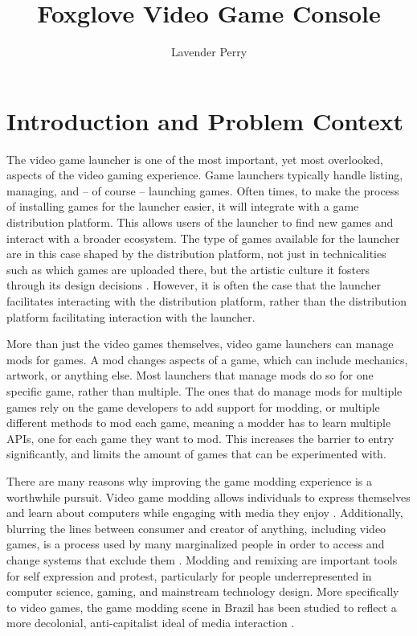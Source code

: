 \documentclass[10pt,twocolumn]{article}
\title{Foxglove Video Game Console}
\author{Lavender Perry}
\affiliation{Occidental College}
\begin{document}
\maketitle

\section{Introduction and Problem Context}

The video game launcher is one of the most important, yet most overlooked,
aspects of the video gaming experience. Game launchers typically handle
listing, managing, and -- of course -- launching games.
Often times, to make the process of installing games for the launcher easier,
it will integrate with a game distribution platform. This allows users of the
launcher to find new games and interact with a broader ecosystem. The type of
games available for the launcher are in this case shaped by the distribution
platform, not just in technicalities such as which games are uploaded there,
but the artistic culture it fosters through its design decisions
\cite{werning_itchio_2019}.
However, it is often the case that the launcher facilitates interacting with the
distribution platform, rather than the distribution platform facilitating
interaction with the launcher.

More than just the video games themselves, video game launchers can manage mods
for games. A mod changes aspects of a game, which can include mechanics,
artwork, or anything else. Most launchers that manage mods do so for one
specific game, rather than multiple. The ones that do manage mods for multiple
games rely on the game developers to add support for modding, or multiple
different methods to mod each game, meaning a modder has to learn multiple
APIs, one for each game they want to mod. This increases the barrier to entry
significantly, and limits the amount of games that can be experimented with.

There are many reasons why improving the game modding experience is a worthwhile
pursuit. Video game modding allows individuals to express themselves and
learn about computers while engaging with media they enjoy
\cite{kacmarcik_introducing_2009}. Additionally, blurring the lines between
consumer and creator of anything, including video games, is a process used by
many marginalized people in order to access and
change systems that exclude them \cite{hamraie_crip_2019}. Modding and remixing
are
important tools for self expression and protest, particularly for
people underrepresented in computer science, gaming, and
mainstream technology design. More specifically to video games, the game modding
scene in Brazil has been studied to reflect a more decolonial, anti-capitalist
ideal of media interaction \cite{messias_emergent_2020}.
\end{document}
